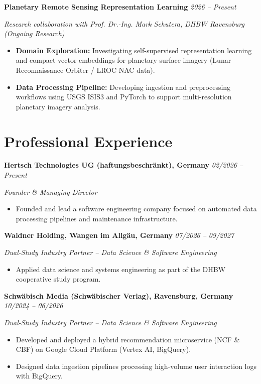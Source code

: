 \documentclass[10pt, a4paper]{article}
\newcommand{\cvitem}[2]{
  \vspace{1.5pt}
  \noindent\textbf{#1} \hfill \textit{#2} \par
  \vspace{-1pt}
}
\begin{document}
\vspace{2pt}
\cvitem{Planetary Remote Sensing Representation Learning}{2026 -- Present}
\textit{Research collaboration with Prof. Dr.-Ing. Mark Schutera, DHBW Ravensburg (Ongoing Research)}
\vspace{-4pt}
\begin{itemize}[leftmargin=0.15in, label=\textbullet, itemsep=1.5pt, topsep=1.5pt]
  \item \textbf{Domain Exploration:} Investigating self-supervised representation learning and compact vector embeddings for planetary surface imagery (Lunar Reconnaissance Orbiter / LROC NAC data).
  \item \textbf{Data Processing Pipeline:} Developing ingestion and preprocessing workflows using USGS ISIS3 and PyTorch to support multi-resolution planetary imagery analysis.
\end{itemize}

\section*{Professional Experience}

\cvitem{Hertsch Technologies UG (haftungsbeschr{\"a}nkt), Germany}{02/2026 -- Present}
\textit{Founder \& Managing Director}
\vspace{-4pt}
\begin{itemize}[leftmargin=0.15in, label=\textbullet, itemsep=1pt, topsep=1.5pt]
  \item Founded and lead a software engineering company focused on automated data processing pipelines and maintenance infrastructure.
\end{itemize}

\vspace{2pt}
\cvitem{Waldner Holding, Wangen im Allg{\"a}u, Germany}{07/2026 -- 09/2027}
\textit{Dual-Study Industry Partner -- Data Science \& Software Engineering}
\vspace{-4pt}
\begin{itemize}[leftmargin=0.15in, label=\textbullet, itemsep=1pt, topsep=1.5pt]
  \item Applied data science and systems engineering as part of the DHBW cooperative study program.
\end{itemize}

\vspace{2pt}
\cvitem{Schw{\"a}bisch Media (Schw{\"a}bischer Verlag), Ravensburg, Germany}{10/2024 -- 06/2026}
\textit{Dual-Study Industry Partner -- Data Science \& Software Engineering}
\vspace{-4pt}
\begin{itemize}[leftmargin=0.15in, label=\textbullet, itemsep=1pt, topsep=1.5pt]
  \item Developed and deployed a hybrid recommendation microservice (NCF \& CBF) on Google Cloud Platform (Vertex AI, BigQuery).
  \item Designed data ingestion pipelines processing high-volume user interaction logs with BigQuery.
\end{itemize}
\end{document}
